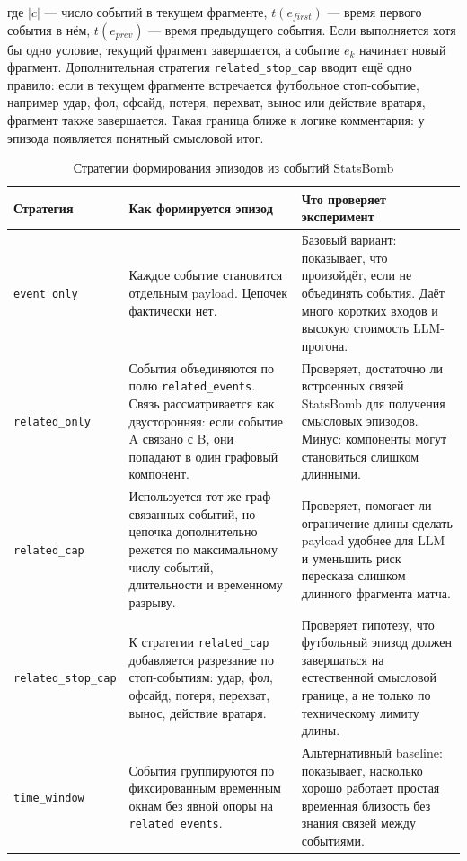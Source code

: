 \documentclass[a4paper,14pt]{extarticle}
\numberwithin{table}{section}
\numberwithin{figure}{section}
\numberwithin{equation}{section}
\begin{document}
где $|c|$ --- число событий в текущем фрагменте, $t(e_{first})$ --- время первого события в нём, $t(e_{prev})$ --- время предыдущего события. Если выполняется хотя бы одно условие, текущий фрагмент завершается, а событие $e_k$ начинает новый фрагмент. Дополнительная стратегия \texttt{related\_stop\_cap} вводит ещё одно правило: если в текущем фрагменте встречается футбольное стоп-событие, например удар, фол, офсайд, потеря, перехват, вынос или действие вратаря, фрагмент также завершается. Такая граница ближе к логике комментария: у эпизода появляется понятный смысловой итог.

\begin{table}[H]
\caption{Стратегии формирования эпизодов из событий StatsBomb}
\label{tab:grouping-strategies}
\centering
\small
\begin{tabular}{p{}p{}p{}}
\toprule
\textbf{Стратегия} & \textbf{Как формируется эпизод} & \textbf{Что проверяет эксперимент} \\
\midrule
\texttt{event\_only} & Каждое событие становится отдельным payload. Цепочек фактически нет. & Базовый вариант: показывает, что произойдёт, если не объединять события. Даёт много коротких входов и высокую стоимость LLM-прогона. \\
\texttt{related\_only} & События объединяются по полю \texttt{related\_events}. Связь рассматривается как двусторонняя: если событие A связано с B, они попадают в один графовый компонент. & Проверяет, достаточно ли встроенных связей StatsBomb для получения смысловых эпизодов. Минус: компоненты могут становиться слишком длинными. \\
\texttt{related\_cap} & Используется тот же граф связанных событий, но цепочка дополнительно режется по максимальному числу событий, длительности и временному разрыву. & Проверяет, помогает ли ограничение длины сделать payload удобнее для LLM и уменьшить риск пересказа слишком длинного фрагмента матча. \\
\texttt{related\_stop\_cap} & К стратегии \texttt{related\_cap} добавляется разрезание по стоп-событиям: удар, фол, офсайд, потеря, перехват, вынос, действие вратаря. & Проверяет гипотезу, что футбольный эпизод должен завершаться на естественной смысловой границе, а не только по техническому лимиту длины. \\
\texttt{time\_window} & События группируются по фиксированным временным окнам без явной опоры на \texttt{related\_events}. & Альтернативный baseline: показывает, насколько хорошо работает простая временная близость без знания связей между событиями. \\
\bottomrule
\end{tabular}
\end{table}
\end{document}

